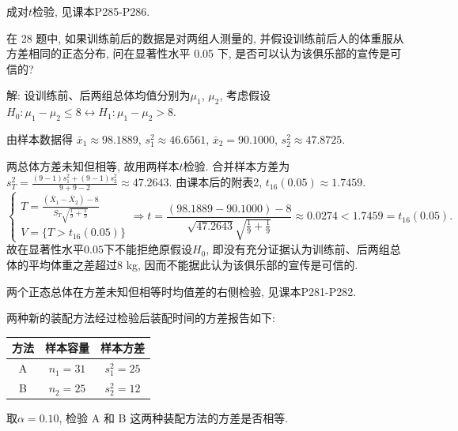 \documentclass[standard]{ExBook}
\renewenvironment{shaded}{%
  \def\FrameCommand{\fboxsep=\FrameSep \colorbox{shadecolor}}%
  \MakeFramed{\advance\hsize-\width \FrameRestore}%
}{%
  \endMakeFramed
}
\begin{document}
\begin{qitems}
\textcolor{themeColor}{\selectfont {} 成对$t$检验, 见课本P285-P286.}

\vspace{2.5cm-5em}

    \begin{bbox}
    \begin{shaded}
        \qitem
在 28 题中, 如果训练前后的数据是对两组人测量的, 并假设训练前后人的体重服从方差相同的正态分布, 问在显著性水平 0.05 下, 是否可以认为该俱乐部的宣传是可信的?
    \end{shaded}
    \end{bbox}

\vspace{\dimexpr2.5cm-5em\relax}

解: 设训练前、后两组总体均值分别为$\mu_1$, $\mu_2$, 考虑假设
$
H_0:\mu_1-\mu_2\leq8
\longleftrightarrow
H_1:\mu_1-\mu_2>8
$.

由样本数据得
$
\bar{x}_1\approx98.1889
$,
$
s_1^2\approx46.6561
$,
$
\bar{x}_2=90.1000
$,
$
s_2^2\approx47.8725
$.

两总体方差未知但相等, 故用两样本$t$检验. 合并样本方差为
$
s_T^2
=
\frac{(9-1)s_1^2+(9-1)s_2^2}{9+9-2}
\approx47.2643
$.
由课本后的附表2, $t_{16}(0.05)\approx1.7459$.
$$
\left\{
\begin{array}{l}
\displaystyle
T
=
\frac{(\overline{X}_1-\overline{X}_2)-8}
{S_T\sqrt{\frac{1}{9}+\frac{1}{9}}}\\
V=\{T>t_{16}(0.05)\}
\end{array}
\right.
\Longrightarrow
t
=
\frac{(98.1889-90.1000)-8}
{\sqrt{47.2643}\sqrt{\frac{1}{9}+\frac{1}{9}}}
\approx0.0274
<
1.7459
=
t_{16}(0.05).
$$
故在显著性水平$0.05$下不能拒绝原假设$H_0$, 即没有充分证据认为训练前、后两组总体的平均体重之差超过$8$ kg, 因而不能据此认为该俱乐部的宣传是可信的.

\textcolor{themeColor}{\selectfont {} 两个正态总体在方差未知但相等时均值差的右侧检验, 见课本P281-P282.}

\vspace{2.5cm-5em}

    \begin{bbox}
    \begin{shaded}
        \qitem
两种新的装配方法经过检验后装配时间的方差报告如下:
\begin{center}
\setlength{\tabcolsep}{59pt}
\begin{tabular}{c|cc}
\hline
方法 & 样本容量 & 样本方差\\
\hline
A & $n_1=31$ & $s_1^2=25$\\
B & $n_2=25$ & $s_2^2=12$\\
\hline
\end{tabular}
\end{center}
取$\alpha=0.10$, 检验 A 和 B 这两种装配方法的方差是否相等.
    \end{shaded}
    \end{bbox}


\end{qitems}
\end{document}
